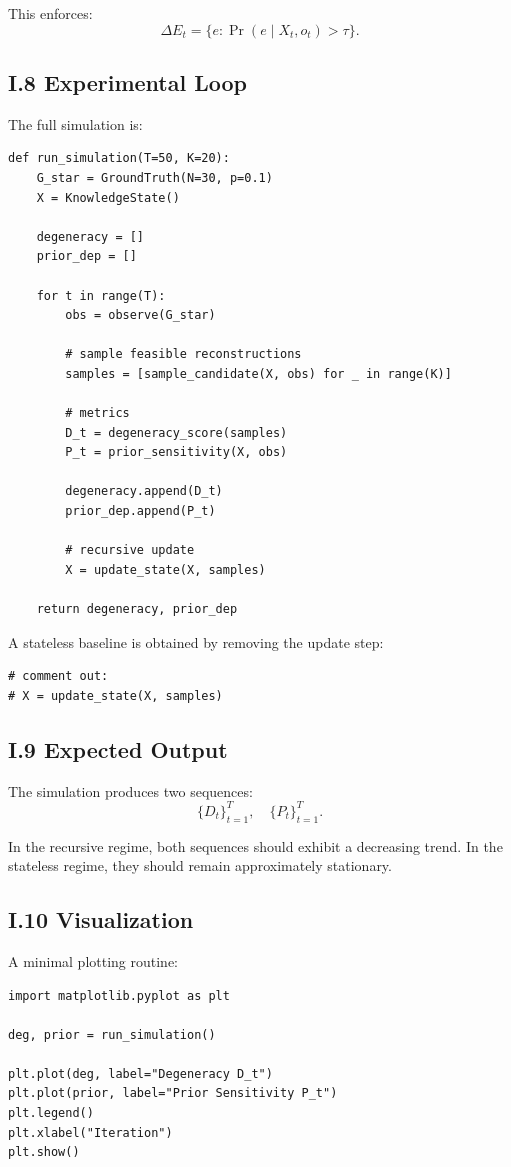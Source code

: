 \documentclass[12pt, oneside]{article}
\theoremstyle{plain}
\theoremstyle{definition}
\theoremstyle{remark}
\begin{document}
This enforces:
\[
\Delta E_t = \{ e : \Pr(e \mid X_t, o_t) > \tau \}.
\]

\subsection{I.8 Experimental Loop}

The full simulation is:

\begin{verbatim}
def run_simulation(T=50, K=20):
    G_star = GroundTruth(N=30, p=0.1)
    X = KnowledgeState()

    degeneracy = []
    prior_dep = []

    for t in range(T):
        obs = observe(G_star)

        # sample feasible reconstructions
        samples = [sample_candidate(X, obs) for _ in range(K)]

        # metrics
        D_t = degeneracy_score(samples)
        P_t = prior_sensitivity(X, obs)

        degeneracy.append(D_t)
        prior_dep.append(P_t)

        # recursive update
        X = update_state(X, samples)

    return degeneracy, prior_dep
\end{verbatim}

A stateless baseline is obtained by removing the update step:
\begin{verbatim}
# comment out:
# X = update_state(X, samples)
\end{verbatim}

\subsection{I.9 Expected Output}

The simulation produces two sequences:
\[
\{D_t\}_{t=1}^T, \quad \{P_t\}_{t=1}^T.
\]

In the recursive regime, both sequences should exhibit a decreasing trend. In the stateless regime, they should remain approximately stationary.

\subsection{I.10 Visualization}

A minimal plotting routine:

\begin{verbatim}
import matplotlib.pyplot as plt

deg, prior = run_simulation()

plt.plot(deg, label="Degeneracy D_t")
plt.plot(prior, label="Prior Sensitivity P_t")
plt.legend()
plt.xlabel("Iteration")
plt.show()
\end{verbatim}
\end{document}
